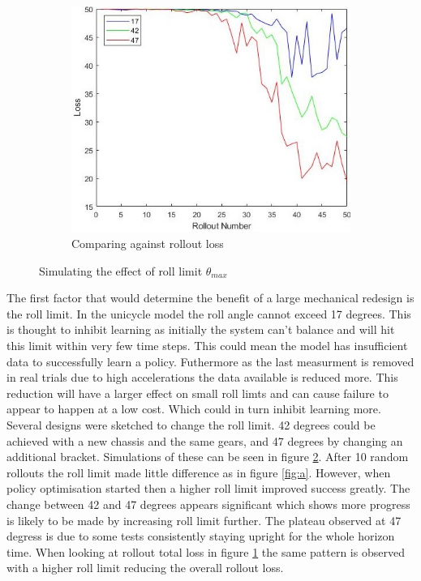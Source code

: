 \documentclass[twoside,twocolumn,12pt]{article}
\begin{document}
\begin{figure}[ht!]
\begin{subfigure}[t]{0.325\textwidth}
  \end{subfigure}
  \begin{subfigure}[t]{0.325\textwidth}
    \includegraphics[width=\linewidth]{lossav}
    \caption{Comparing against rollout loss}
  \label{fig:rl}
  \end{subfigure}
  \caption{Simulating the effect of roll limit $\theta_{max}$ }
  \label{fig:rolllimit}
\end{figure}
The first factor that would determine the benefit of a large mechanical redesign is the roll limit. In the unicycle model the roll angle cannot exceed 17 degrees. This is thought to inhibit learning as initially the system can't balance and will hit this limit within very few time steps. This could mean the model has insufficient data to successfully learn a policy. Futhermore as the last measurment is removed in real trials due to high accelerations the data available is reduced more. This reduction will have a larger effect on small roll limts and can cause failure to appear to happen at a low cost. Which could in turn inhibit learning more.
\newline
Several designs were sketched to change the roll limit. 42 degrees could be achieved with a new chassis and the same gears, and 47 degrees by changing an additional bracket. Simulations of these can be seen in figure \ref{fig:rolllimit}.
\newline
After 10 random rollouts the roll limit made little difference as in figure \ref{fig:a}. However, when policy optimisation started then a higher roll limit improved success greatly. The change between 42 and 47 degrees appears significant which shows more progress is likely to be made by increasing roll limit further. The plateau observed at 47 degress is due to some tests consistently staying upright for the whole horizon time. When looking at rollout total loss in figure \ref{fig:rl} the same pattern is observed with a higher roll limit reducing the overall rollout loss.
\end{document}
